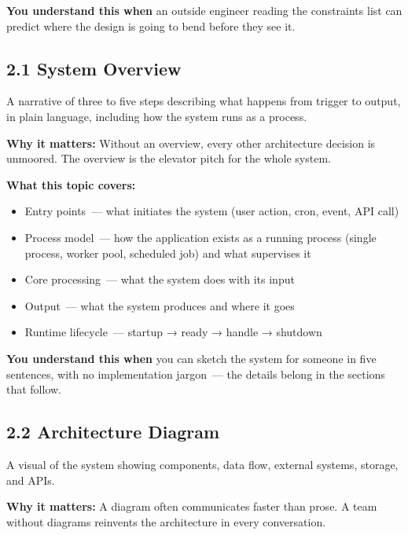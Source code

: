 \noindent{}\textbf{You understand this when} an outside engineer reading the constraints list can predict where the design is going to bend before they see it.

\label{project-planning-guide:section-2--architecture--design}

\subsection*{2.1 System Overview}\label{project-planning-guide:21-system-overview}

A narrative of three to five steps describing what happens from trigger to output, in plain language, including how the system runs as a process.

\textbf{Why it matters:} Without an overview, every other architecture decision is unmoored. The overview is the elevator pitch for the whole system.

\textbf{What this topic covers:}

\begin{itemize}
\tightlist
\item
  Entry points~--- what initiates the system (user action, cron, event, API call)
\item
  Process model~--- how the application exists as a running process (single process, worker pool, scheduled job) and what supervises it
\item
  Core processing~--- what the system does with its input
\item
  Output~--- what the system produces and where it goes
\item
  Runtime lifecycle~--- startup → ready → handle → shutdown
\end{itemize}

\noindent{}\textbf{You understand this when} you can sketch the system for someone in five sentences, with no implementation jargon~--- the details belong in the sections that follow.

\subsection*{2.2 Architecture Diagram}\label{project-planning-guide:22-architecture-diagram}

A visual of the system showing components, data flow, external systems, storage, and APIs.

\textbf{Why it matters:} A diagram often communicates faster than prose. A team without diagrams reinvents the architecture in every conversation.

